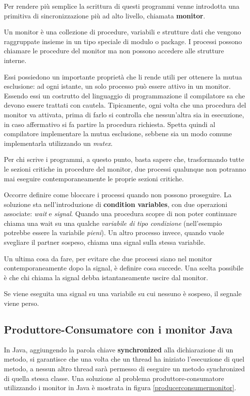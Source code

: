 Per rendere più semplice la scrittura di questi programmi venne introdotta una primitiva di sincronizzazione più ad alto livello, chiamata \textbf{monitor}.

Un monitor è una collezione di procedure, variabili e strutture dati che vengono raggruppate insieme in un tipo speciale di modulo o package. I processi possono chiamare le procedure del monitor ma non possono accedere alle strutture interne.

Essi possiedono un importante proprietà che li rende utili per ottenere la mutua esclusione: ad ogni istante, un solo processo può essere attivo in un monitor. Essendo essi un costrutto del linguaggio di programmazione il compilatore sa che devono essere trattati con cautela. Tipicamente, ogni volta che una procedura del monitor va attivata, prima di farlo si controlla che nessun'altra sia in esecuzione, in caso affermativo si fa partire la procedura richiesta.
Spetta quindi al compilatore implementare la mutua esclusione, sebbene sia un modo comune implementarla utilizzando un \textit{mutex}.

Per chi scrive i programmi, a questo punto, basta sapere che, trasformando tutte le sezioni critiche in procedure del monitor, due processi qualunque non potranno mai eseguire contemporaneamente le proprie sezioni critiche.

Occorre definire come bloccare i processi quando non possono proseguire.
La soluzione sta nell'introduzione di \textbf{condition variables}, con due operazioni associate: \textit{wait} e \textit{signal}. Quando una procedura scopre di non poter continuare chiama una wait su una qualche \textit{variabile di tipo condizione} (nell'esempio potrebbe essere la variabile \textit{pieni}). Un altro processo invece, quando vuole svegliare il partner sospeso, chiama una signal sulla stessa variabile.

Un ultima cosa da fare, per evitare che due processi siano nel monitor contemporaneamente dopo la signal, è definire cosa succede. Una scelta possibile è che chi chiama la signal debba istantaneamente uscire dal monitor.

Se viene eseguita una signal su una variabile su cui nessuno è sospeso, il segnale viene perso.

\subsection{Produttore-Consumatore con i monitor Java}

In Java, aggiungendo la parola chiave \textbf{synchronized} alla dichiarazione di un metodo, si garantisce che una volta che un thread ha iniziato l'esecuzione di quel metodo, a nessun altro thread sarà permesso di eseguire un metodo synchronized di quella stessa classe. Una soluzione al problema produttore-consumatore utilizzando i monitor in Java è mostrata in figura \ref{producerconsumermonitor}.

